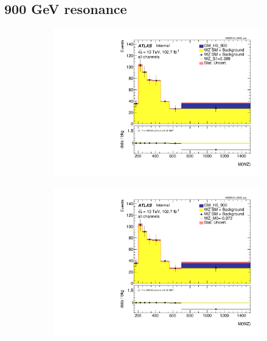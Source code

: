 \documentclass[../Bachelorarbeit.tex]{subfiles}
\begin{document}
\subsection{900 GeV resonance}
\begin{figure}[h]

    \centering
    \begin{subfigure}{0.45\textwidth}
        \includegraphics[width=\textwidth]{Plots/ALL_MWZ_right_color/GM_H5_900/S1/2022-05-07/VBSSR/all_VV_MWZ_vbs.pdf}
    \end{subfigure}
    \begin{subfigure}{0.45\textwidth}
        \includegraphics[width=\textwidth]{Plots/ALL_MWZ_right_color/GM_H5_900/M0/2022-05-07/VBSSR/all_VV_MWZ_vbs.pdf}
    \end{subfigure}
    \begin{subfigure}{0.45\textwidth}

\end{subfigure}
\end{figure}
\end{document}
